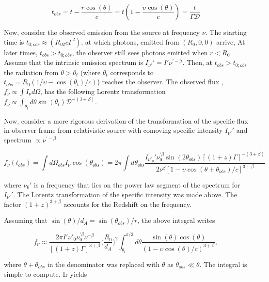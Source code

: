 \begin{equation}
t_{obs} = t - \frac{r \cos(\theta)}{c} = t(1-\frac{\upsilon\cos(\theta)}{c}) = \frac{t}{\Gamma\mathcal{D}}
\end{equation}

Now, consider the observed emission from the source at frequency $\nu$. The starting time is $t_{0;obs}\approx(R_02c\Gamma^2)$, at which photons, emitted from $(R_0,0,0)$ arrive, At later times, $t_{obs}>t_{0;obs}$, the observer still sees photons emitted when $r < R_0$. 
Assume that the intrinsic emission spectrum is $I_{\nu'}' = I'\nu^{'-\beta}$.
Then, at $t_{obs} > t_{0;obs}$ the radiation from $\theta > \theta_t$ (where $\theta_t$ corresponds to $t_{obs} = R_0(1/\upsilon - \cos(\theta_t)/c)$) reaches the observer.
The observed flux \eg, $f_{\nu} \propto \int I_{\nu} d\Omega$, has the following Lorentz transformation $f_{\nu}\propto\int_{\theta_t} d\theta \sin(\theta_t) \mathcal{D}^{-(3+\beta)}$.

Now, consider a more rigorous derivation of the transformation of the specific flux in observer frame from relativistic source with comoving specific intensity $I_{\nu'}'$ and spectrum $\propto \nu^{' -\beta}$

\begin{equation}
f_{\nu}(t_{obs}) = \int d\Omega_{obs} I_{\nu} \cos(\theta_{obs}) = 2\pi \int d\theta_{obs} \frac{ I_{\nu'_0}' \nu_{0}^{'\beta}\sin(2\theta_{obs})[(1+z)\Gamma]^{-(3+\beta)} }{ 2\nu^{\beta} [ 1-\upsilon\cos(\theta + \theta_{obs}) / c ]^{3+\beta} }
\end{equation}

where $\nu_0 '$ is a frequency that lies on the power law segment of the spectrum for $I_{\nu'}'$. The Lorentz transformation of the specific intensity was made above. The factor $(1+z)^{3+\beta}$ accounts for the Redshift on the frequency. 

Assuming that $\sin(\theta)/d_{A} = \sin(\theta_{obs})/r$, the above integral writes 

\begin{equation}
f_{\nu} \approx \frac{ 2\pi I' \nu' _0 \nu_{0}^{'\beta}\nu^{-\beta} }{[(1+z)\Gamma]^{3+\beta}} \Big( \frac{R_0}{d_A} \Big)^2 \int_{\theta_t}^{\pi / 2} d\theta \frac{\sin(\theta)\cos(\theta)}{(1-\upsilon\cos(\theta)/c)^{3+\beta}},
\end{equation}

where $\theta+\theta_{obs}$ in the denominator was replaced with $\theta$ as $\theta_{obs}\ll\theta$.
The integral is simple to compute. Ir yields

